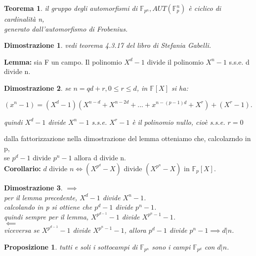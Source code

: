 \documentclass[a4paper,12pt]{article}
\theoremstyle{def}
\theoremstyle{prop}
\newtheorem*{proposition}{Proposizione}
\theoremstyle{esempio}
\theoremstyle{dimostrazione}
\newtheorem*{dimostrazione}{Dimostrazione}
\theoremstyle{teo}
\newtheorem*{teorema}{Teorema}
\theoremstyle{osservazione}
\begin{document}
\begin{teorema}
	il gruppo degli automorfismi di \(\mathbb{F}_{p^n}, AUT(\mathbb{F}_p^n)\) è ciclico di cardinalità n,\\
	generato dall'automorfismo di Frobenius.
\end{teorema}

\begin{dimostrazione}
	vedi teorema 4.3.17 del libro di Stefania Gabelli.
\end{dimostrazione}

\textbf{Lemma:} sia F un campo. Il polinomio \(X^d - 1\) divide il polinomio \(X^n - 1\) s.s.e. d divide n.

\begin{dimostrazione}
	se \(n = qd + r, 0 \leq r \leq d\), in \(\mathbb{F}[X]\) si ha:
	\begin{center}
		\((x^n - 1) = (X^d - 1)(X^{n-d} + X^{n-2d} + ... + x^{n-(p-1)d} + X^r) + (X^r -1).\)\\
	\end{center}
	quindi \(X^d - 1\) divide \(X^n - 1\) s.s.e. \(X^r - 1\) è il polinomio nullo, cioè s.s.e. \(r = 0\)
\end{dimostrazione}

\vspace{\baselineskip}

dalla fattorizzazione nella dimostrazione del lemma otteniamo che, calcolazndo in p,\\
se \(p^d - 1\) divide \(p^n - 1\) allora d divide n.\\

\textbf{Corollario:} \(d\) divide \(n \iff (X^{p^d} - X)\) divide \((X^{p^n} - X)\) in \(\mathbb{F}_p[X]\).

\begin{dimostrazione}
	\(\implies\)\\
	per il lemma precedente, \(X^d - 1\) divide \(X^n - 1\).\\
	calcolando in p si ottiene che \(p^d - 1\) divide \(p^n - 1\).\\
	quindi sempre per il lemma, \(X^{p^{d - 1}} - 1\) divide \(X^{p^n - 1} - 1\).\\
	\(\impliedby\)\\
	viceversa se \(X^{p^{d - 1}} - 1\) divide \(X^{p^n -1 } - 1\), allora \(p^d - 1\) divide \(p^n - 1 \implies d | n\).\\
\end{dimostrazione}

\begin{proposition}
	tutti e soli i sottocampi di \(\mathbb{F}_{p^n}\) sono i campi \(\mathbb{F}_{p^d}\) con \(d | n\).
\end{proposition}
\end{document}
